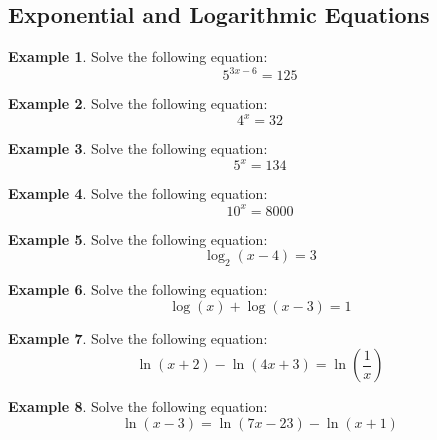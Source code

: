 \documentclass[addpoints,12pt]{exam}
\theoremstyle{definition}
\theoremstyle{break}
\theoremstyle{break}
\newtheorem{example}{Example}[subsection]
\begin{document}
\setcounter{section}{12}
\setcounter{subsection}{3}

\subsection{Exponential and Logarithmic Equations}
\vspace{.15in}

\begin{example}
Solve the following equation:
\[5^{3x-6} = 125\]
\vspace{1.8in}
\end{example}

\begin{example}
Solve the following equation:
\[4^x = 32\]
\vspace{1.8in}
\end{example}

\begin{example}
Solve the following equation:
\[5^x = 134\]
\end{example}

\newpage

\begin{example}
Solve the following equation:
\[10^x = 8000\]
\vspace{1.5in}
\end{example}

\begin{example}
Solve the following equation:
\[\log_2{(x-4)} = 3\]
\vspace{1.75in}
\end{example}

\begin{example}
Solve the following equation:
\[\log{(x)} + \log{(x-3)} = 1\]
\end{example}

\newpage
\begin{example}
Solve the following equation:
\[\ln{(x+2)} - \ln{(4x+3)} = \ln{\left(\dfrac{1}{x}\right)}\]
\vspace{3.25in}
\end{example}

\begin{example}
Solve the following equation:
\[\ln{(x-3)} = \ln{(7x-23)} - \ln{(x+1)}\]
\vspace{2in}
\end{example}
\end{document}
